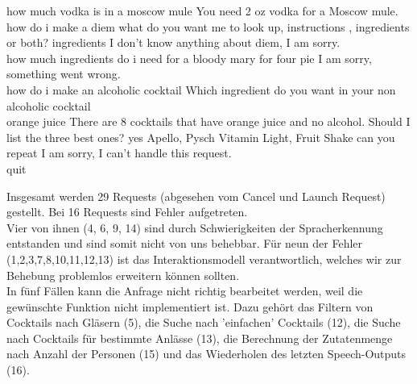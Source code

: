 \documentclass[12pt,letterpaper]{article}
\begin{document}
\begin{dialogue}
	 how much vodka is in a moscow mule
	 You need 2 oz vodka for a Moscow mule.
	 how do i make a diem
	 what do you want me to look up, instructions , ingredients or both?
	 ingredients
	 I don't know anything about diem, I am sorry. \\
	 how much ingredients do i need for a bloody mary for four pie
	 I am sorry, something went wrong. \\
	 how do i make an alcoholic cocktail
	 Which ingredient do you want in your non alcoholic cocktail \\
	 orange juice
	 There are 8 cocktails that have orange juice and no alcohol. Should I list the three best ones?
	 yes
	 Apello, Pysch Vitamin Light, Fruit Shake
	 can you repeat
	 I am sorry, I can't handle this request. \\
	 quit
\end{dialogue}

Insgesamt werden 29 Requests (abgesehen vom Cancel und Launch Request) gestellt. Bei 16 Requests sind Fehler aufgetreten. \\ Vier von ihnen (4, 6, 9, 14) sind durch Schwierigkeiten der Spracherkennung entstanden und sind somit nicht von uns behebbar. Für neun der Fehler (1,2,3,7,8,10,11,12,13) ist das Interaktionsmodell verantwortlich, welches wir zur Behebung problemlos erweitern können sollten. \\ In fünf Fällen kann die Anfrage nicht richtig bearbeitet werden, weil die gewünschte Funktion nicht implementiert ist. Dazu gehört das Filtern von Cocktails nach Gläsern (5), die Suche nach 'einfachen' Cocktails (12), die Suche nach Cocktails für bestimmte Anlässe (13), die Berechnung der Zutatenmenge nach Anzahl der Personen (15) und das Wiederholen des letzten Speech-Outputs (16).
\end{document}
